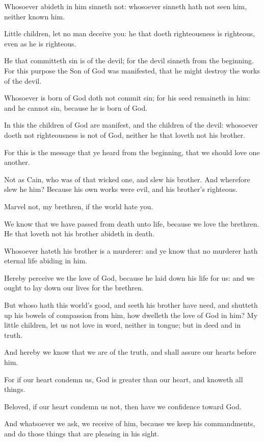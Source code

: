 \verse Whosoever abideth in him sinneth not: whosoever sinneth hath not seen him, neither known him.

\verse Little children, let no man deceive you: he that doeth righteousness is righteous, even as he is righteous.

\verse He that committeth sin is of the devil; for the devil sinneth from the beginning. For this purpose the Son of God was manifested, that he might destroy the works of the devil.

\verse Whosoever is born of God doth not commit sin; for his seed remaineth in him: and he cannot sin, because he is born of God.

\verse In this the children of God are manifest, and the children of the devil: whosoever doeth not righteousness is not of God, neither he that loveth not his brother.

\verse For this is the message that ye heard from the beginning, that we should love one another.

\verse Not as Cain, who was of that wicked one, and slew his brother.  And wherefore slew he him? Because his own works were evil, and his brother's righteous.

\verse Marvel not, my brethren, if the world hate you.

\verse We know that we have passed from death unto life, because we love the brethren. He that loveth not his brother abideth in death.

\verse Whosoever hateth his brother is a murderer: and ye know that no murderer hath eternal life abiding in him.

\verse Hereby perceive we the love of God, because he laid down his life for us: and we ought to lay down our lives for the brethren.

\verse But whoso hath this world's good, and seeth his brother have need, and shutteth up his bowels of compassion from him, how dwelleth the love of God in him?  \verse My little children, let us not love in word, neither in tongue; but in deed and in truth.

\verse And hereby we know that we are of the truth, and shall assure our hearts before him.

\verse For if our heart condemn us, God is greater than our heart, and knoweth all things.

\verse Beloved, if our heart condemn us not, then have we confidence toward God.

\verse And whatsoever we ask, we receive of him, because we keep his commandments, and do those things that are pleasing in his sight.


